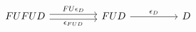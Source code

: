 \[\begin{tikzcd}
	FUFUD && FUD && D
	\arrow["{FU\epsilon_{D}}", shift left, from=1-1, to=1-3]
	\arrow["{\epsilon_{FUD}}"', shift right, from=1-1, to=1-3]
	\arrow["{\epsilon_{D}}", from=1-3, to=1-5]
\end{tikzcd}\]